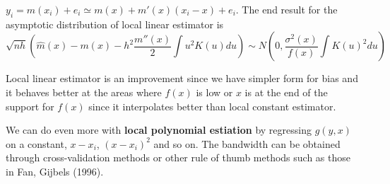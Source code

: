 \documentclass[12pt]{article}
\theoremstyle{definition}
\theoremstyle{property}
\theoremstyle{assumption}
\theoremstyle{example}
\theoremstyle{comment}
\begin{document}
$ y_i = m(x_i)+e_i \simeq m(x) + m'(x)(x_i-x)+e_i$. The end result for the asymptotic distribution of local linear estimator is 
 \[
 \sqrt{nh}\left(\hat{m}(x)-m(x)-h^2 \frac{m''(x)}{2} \int u^2K(u)du\right)\sim N\left(0, \frac{\sigma^2(x)}{f(x)}\int K\left(u\right)^2du \right)
 \]
 \par
 Local linear estimator is an improvement since we have simpler form for bias and it behaves better at the areas where $f(x)$ is low or $x$ is at the end of the support for $f(x)$ since it interpolates better than local constant estimator.
  \par
 We can do even more with \textbf{local polynomial estiation} by regressing $g(y,x)$ on a constant, $x-x_i$, $(x-x_i)^2$ and so on. 
The bandwidth can be obtained through cross-validation methods or other rule of thumb methods such as those in Fan, Gijbels (1996). 
\end{document}
